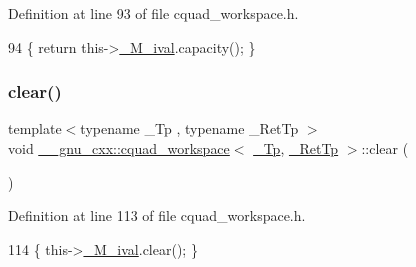 Definition at line 93 of file cquad\+\_\+workspace.\+h.


\begin{DoxyCode}
94       \{ \textcolor{keywordflow}{return} this->\hyperlink{struct____gnu__cxx_1_1cquad__workspace_a46edeb05c52f2a406dc582b404fe83e6}{\_M\_ival}.capacity(); \}
\end{DoxyCode}
\mbox{\label{struct____gnu__cxx_1_1cquad__workspace_ac3b3e8c4e17571349b56ac1635789b34}} 
\subsubsection{\texorpdfstring{clear()}{clear()}}
{\footnotesize\ttfamily template$<$typename \+\_\+\+Tp , typename \+\_\+\+Ret\+Tp $>$ \\
void \hyperlink{struct____gnu__cxx_1_1cquad__workspace}{\+\_\+\+\_\+gnu\+\_\+cxx\+::cquad\+\_\+workspace}$<$ \hyperlink{namespace____gnu__cxx_a3b19a9c800ca194374ef9172290f7d79}{\+\_\+\+Tp}, \hyperlink{namespace____gnu__cxx_a886e03ece3d53ff7fa6c098a40f93fa5}{\+\_\+\+Ret\+Tp} $>$\+::clear (\begin{DoxyParamCaption}{ }\end{DoxyParamCaption})\hspace{0.3cm}{\ttfamily [inline]}}



Definition at line 113 of file cquad\+\_\+workspace.\+h.


\begin{DoxyCode}
114       \{ this->\hyperlink{struct____gnu__cxx_1_1cquad__workspace_a46edeb05c52f2a406dc582b404fe83e6}{\_M\_ival}.clear(); \}
\end{DoxyCode}
\mbox{\label{struct____gnu__cxx_1_1cquad__workspace_a61729a1acaa035013ebb0ed6e4ffcbf4}} 
